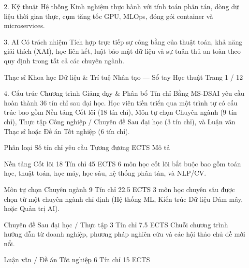 2. Kỹ thuật Hệ thống
Kinh nghiệm thực hành với tính toán phân tán, dòng dữ liệu thời gian thực, cụm tăng tốc GPU, MLOps, đóng gói container và microservices.

3. AI Có trách nhiệm
Tích hợp trực tiếp sự công bằng của thuật toán, khả năng giải thích (XAI), học liên kết, luật bảo mật dữ liệu và sự tuân thủ an toàn theo quy định trong tất cả các chuyên ngành.

Thạc sĩ Khoa học Dữ liệu & Trí tuệ Nhân tạo — Sổ tay Học thuật Trang 1 / 12

4. Cấu trúc Chương trình Giảng dạy & Phân bổ Tín chỉ
Bằng MS-DSAI yêu cầu hoàn thành 36 tín chỉ sau đại học. Học viên tiến triển qua một trình tự có cấu trúc bao gồm Nền tảng Cốt lõi (18 tín chỉ), Môn tự chọn Chuyên ngành (9 tín chỉ), Thực tập Công nghiệp / Chuyên đề Sau đại học (3 tín chỉ), và Luận văn Thạc sĩ hoặc Đề án Tốt nghiệp (6 tín chỉ).

Phân loại
Số tín chỉ yêu cầu
Tương đương ECTS
Mô tả

Nền tảng Cốt lõi
18 Tín chỉ
45 ECTS
6 môn học cốt lõi bắt buộc bao gồm toán học, thuật toán, học máy, học sâu, hệ thống phân tán, và NLP/CV.

Môn tự chọn Chuyên ngành
9 Tín chỉ
22.5 ECTS
3 môn học chuyên sâu được chọn từ một chuyên ngành chỉ định (Hệ thống ML, Kiến trúc Dữ liệu Đám mây, hoặc Quản trị AI).

Chuyên đề Sau đại học / Thực tập
3 Tín chỉ
7.5 ECTS
Chuỗi chương trình hướng dẫn từ doanh nghiệp, phương pháp nghiên cứu và các hội thảo chủ đề mới nổi.

Luận văn / Đề án Tốt nghiệp
6 Tín chỉ
15 ECTS

